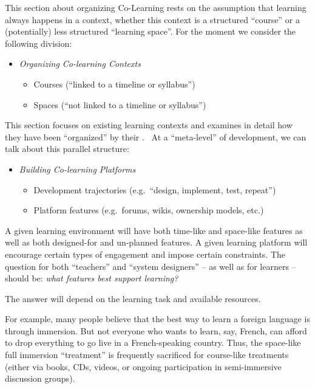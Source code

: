 This section about organizing Co-Learning rests on the assumption that
learning always happens in a context, whether this context is a
structured ``course'' or a (potentially) less structured ``learning
space''. For the moment we consider the following division:

\begin{itemize}
\tightlist
\item
  \emph{Organizing Co-learning Contexts}

  \begin{itemize}
  \tightlist
  \item
    Courses (``linked to a timeline or syllabus'')
  \item
    Spaces (``not linked to a timeline or syllabus'')
  \end{itemize}
\end{itemize}

This section focuses on existing learning contexts and examines in
detail how they have been ``organized'' by their .~ At a ``meta-level''
of development, we can talk about this parallel structure:

\begin{itemize}
\tightlist
\item
  \emph{Building Co-learning Platforms}

  \begin{itemize}
  \tightlist
  \item
    Development trajectories (e.g.~``design, implement, test, repeat'')
  \item
    Platform features (e.g.~forums, wikis, ownership models, etc.)
  \end{itemize}
\end{itemize}

A given learning environment will have both time-like and space-like
features as well as both designed-for and un-planned features. A given
learning platform will encourage certain types of engagement and impose
certain constraints. The question for both ``teachers'' and ``system
designers'' -- as well as for learners -- should be: \emph{what features
best support learning?}

The answer will depend on the learning task and available resources.

For example, many people believe that the best way to learn a foreign
language is through immersion. But not everyone who wants to learn, say,
French, can afford to drop everything to go live in a French-speaking
country. Thus, the space-like full immersion ``treatment'' is frequently
sacrificed for course-like treatments (either via books, CDs, videos, or
ongoing participation in semi-immersive discussion groups).

